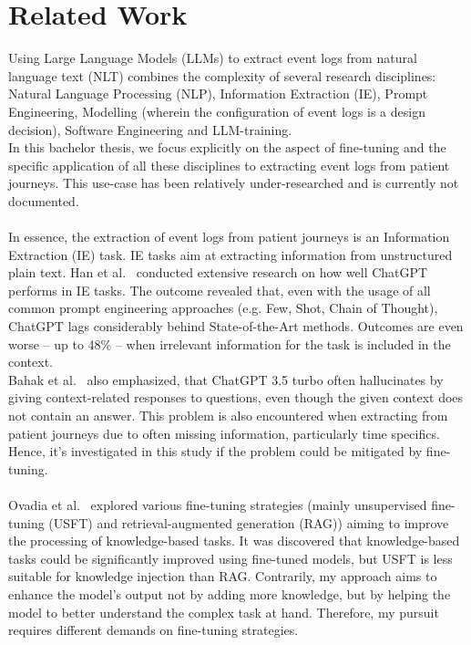 \section{Related Work}
\label{related_work}
Using Large Language Models (LLMs) to extract event logs from natural language text (NLT) combines the complexity of several research disciplines: Natural Language Processing (NLP), Information Extraction (IE), Prompt Engineering, Modelling (wherein the configuration of event logs is a design decision), Software Engineering and LLM-training.\\
In this bachelor thesis, we focus explicitly on the aspect of fine-tuning and the specific application of all these disciplines to extracting event logs from patient journeys. This use-case has been relatively under-researched and is currently not documented.\\\\
In essence, the extraction of event logs from patient journeys is an Information Extraction (IE) task. IE tasks aim at extracting information from unstructured plain text. Han et al.~\cite{han_is_2023} conducted extensive research on how well ChatGPT performs in IE tasks. The outcome revealed that, even with the usage of all common prompt engineering approaches (e.g. Few, Shot, Chain of Thought), ChatGPT lags considerably behind State-of-the-Art methods. Outcomes are even worse – up to 48\% – when irrelevant information for the task is included in the context.\\
Bahak et al.~\cite{bahak_evaluating_2023} also emphasized, that ChatGPT 3.5 turbo often hallucinates by giving context-related responses to questions, even though the given context does not contain an answer. This problem is also encountered when extracting from patient journeys due to often missing information, particularly time specifics. Hence, it's investigated in this study if the problem could be mitigated by fine-tuning.\\\\
Ovadia et al.~\cite{ovadia_fine-tuning_2024} explored various fine-tuning strategies (mainly unsupervised fine-tuning (USFT) and retrieval-augmented generation (RAG)) aiming to improve the processing of knowledge-based tasks. It was discovered that knowledge-based tasks could be significantly improved using fine-tuned models, but USFT is less suitable for knowledge injection than RAG. Contrarily, my approach aims to enhance the model's output not by adding more knowledge, but by helping the model to better understand the complex task at hand. Therefore, my pursuit requires different demands on fine-tuning strategies.\\\\

